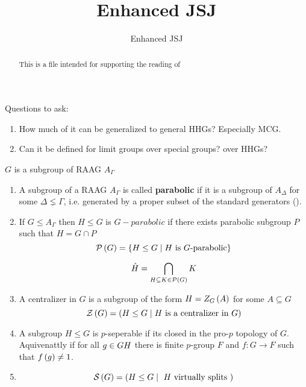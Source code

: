 \documentclass[11pt,a4paper]{article}
\title{Enhanced JSJ}
\author{Enhanced JSJ}
\date{}
\begin{document}
 
\maketitle
\begin{abstract}
    This is a file intended for supporting the reading of \cite{Fiv25}
\end{abstract}

Questions to ask:
\begin{enumerate}
    \item How much of it can be generalized to general HHGs? Especially MCG.
    \item Can it be defined for limit groups over special groups? over HHGs?
\end{enumerate}


$G$ is a subgroup of RAAG $A_\Gamma$


\begin{definition}
    \begin{enumerate}
        \item A subgroup of a RAAG $A_\Gamma$ is called \textbf{parabolic} if it is a subgroup of $A_\Delta$ for some $\Delta \lneq \Gamma$, i.e. generated by a proper subset of the standard generators ().
        \item If $G\leq A_\Gamma$ then $H\leq G$ is $G-parabolic$ if there exists parabolic subgroup $P$ such that $H=G\cap P$
        \begin{equation*}
            \mathcal{P} \left(  G  \right) = \left\{  H \leq G \mid \mbox{$H$ is $G$-parabolic}  \right\}
        \end{equation*}
        
        \begin{equation*}
            \hat{H} = \bigcap_{H \subseteq K\in \mathcal{P}\left(  G  \right)} K
        \end{equation*}
        \item A centralizer in $G$ is a subgroup of the form $H=Z_G\left(  A  \right)$ for some $A\subseteq G$
        \begin{equation*}
            \mathcal{Z} \left(  G  \right) = \left(  H \leq G \mid \mbox{$H$ is a centralizer in $G$}  \right)
        \end{equation*}
        \item A subgroup $H\leq G$ is $p$-seperable if its closed in the pro-$p$ topology of $G$. Aquivenattly if for all $g\in G\\H$ there is finite $p$-group $F$ and $f:G\to F$ such that $f\left(  g  \right)\neq1$.
        \item 
        \begin{equation*}

            
        \cals \rb{ G } = \rb{ H \leq G \mid \mbox{ $H$ virtually splits  } }
        \end{equation*}
    \end{enumerate}
\end{definition}



\printbibliography
\end{document}
